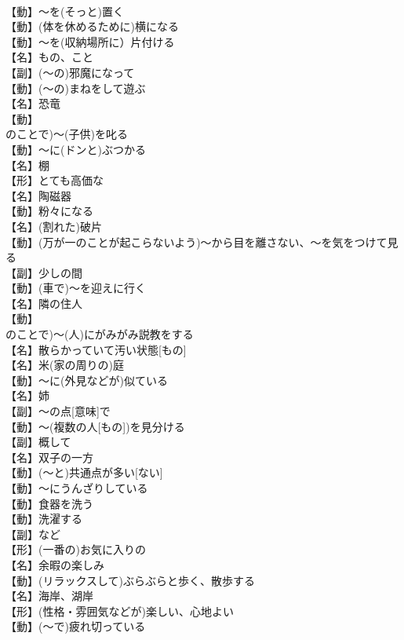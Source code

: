 \documentclass[8pt]{extreport}
\begin{document}
\begin{CJK}{UTF8}{min}
\\	【動】～を(そっと)置く
\\	【動】(体を休めるために)横になる
\\	【動】～を(収納場所に）片付ける
\\	【名】もの、こと
\\	【副】(～の)邪魔になって
\\	【動】(～の)まねをして遊ぶ
\\	【名】恐竜
\\	【動】
\\	のことで)～(子供)を叱る
\\	【動】～に(ドンと)ぶつかる
\\	【名】棚
\\	【形】とても高価な
\\	【名】陶磁器
\\	【動】粉々になる
\\	【名】(割れた)破片
\\	【動】(万が一のことが起こらないよう)～から目を離さない、～を気をつけて見る
\\	【副】少しの間
\\	【動】(車で)～を迎えに行く
\\	【名】隣の住人
\\	【動】
\\	のことで)～(人)にがみがみ説教をする
\\	【名】散らかっていて汚い状態[もの]
\\	【名】{米}(家の周りの)庭
\\	【動】～に(外見などが)似ている
\\	【名】姉
\\	【副】～の点[意味]で
\\	【動】～(複数の人[もの])を見分ける
\\	【副】概して
\\	【名】双子の一方
\\	【動】(～と)共通点が多い[ない]
\\	【動】～にうんざりしている
\\	【動】食器を洗う
\\	【動】洗濯する
\\	【副】など
\\	【形】(一番の)お気に入りの
\\	【名】余暇の楽しみ
\\	【動】(リラックスして)ぶらぶらと歩く、散歩する
\\	【名】海岸、湖岸
\\	【形】(性格・雰囲気などが)楽しい、心地よい
\\	【動】(～で)疲れ切っている

\end{CJK}
\end{document}
